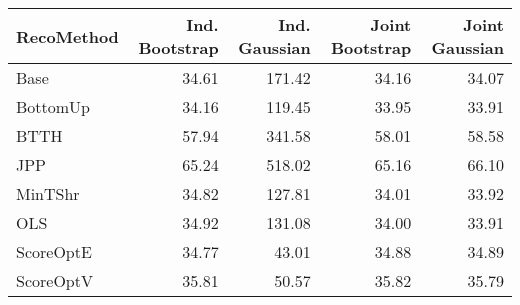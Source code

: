 
\begin{tabular}{l|r|r|r|r}
\hline
RecoMethod & Ind. Bootstrap & Ind. Gaussian & Joint Bootstrap & Joint Gaussian\\
\hline
Base & 34.61 & 171.42 & 34.16 & 34.07\\
\hline
BottomUp & 34.16 & 119.45 & 33.95 & 33.91\\
\hline
BTTH & 57.94 & 341.58 & 58.01 & 58.58\\
\hline
JPP & 65.24 & 518.02 & 65.16 & 66.10\\
\hline
MinTShr & 34.82 & 127.81 & 34.01 & 33.92\\
\hline
OLS & 34.92 & 131.08 & 34.00 & 33.91\\
\hline
ScoreOptE & 34.77 & 43.01 & 34.88 & 34.89\\
\hline
ScoreOptV & 35.81 & 50.57 & 35.82 & 35.79\\
\hline
\end{tabular}
